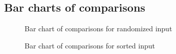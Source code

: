 \documentclass[12pt,a4paper]{article}
\begin{document}
\subsection{Bar charts of comparisons}
\begin{center}
\begin{figure}[H]
\caption{Bar chart of comparisons for randomized input}
\end{figure}
\end{center}

\begin{center}
\begin{figure}[H]
\caption{Bar chart of comparisons for sorted input}
\end{figure}
\end{center}
\end{document}
